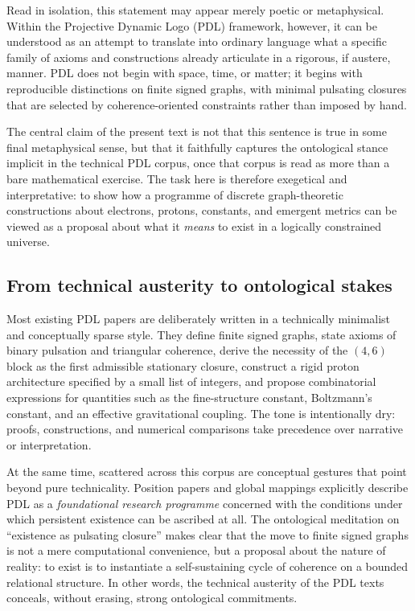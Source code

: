 \documentclass[11pt,a4paper]{article}
\theoremstyle{definition}
\begin{document}
Read in isolation, this statement may appear merely poetic or metaphysical. Within the Projective Dynamic Logo (PDL) framework, however, it can be understood as an attempt to translate into ordinary language what a specific family of axioms and constructions already articulate in a rigorous, if austere, manner.\cite{Laubscher_IntroPDL_2024,Laubscher_EmergencePhysicalReality_2024,Laubscher_PDL_Position_2024} PDL does not begin with space, time, or matter; it begins with reproducible distinctions on finite signed graphs, with minimal pulsating closures that are selected by coherence-oriented constraints rather than imposed by hand.

The central claim of the present text is not that this sentence is true in some final metaphysical sense, but that it faithfully captures the ontological stance implicit in the technical PDL corpus, once that corpus is read as more than a bare mathematical exercise. The task here is therefore exegetical and interpretative: to show how a programme of discrete graph-theoretic constructions about electrons, protons, constants, and emergent metrics can be viewed as a proposal about what it \emph{means} to exist in a logically constrained universe.\cite{Laubscher_Existence_PulsatingClosure_2026,Laubscher_PDL_GlobalMapping_v6_2024}

\subsection{From technical austerity to ontological stakes}

Most existing PDL papers are deliberately written in a technically minimalist and conceptually sparse style.\cite{Laubscher_EmergencePhysicalReality_2024,Laubscher_MinimalClosures_46_2024,Laubscher_ProtonArch_v2_2024,Laubscher_Alpha_v2_2024,Laubscher_EffectiveFields_2024,Laubscher_CavityModes_PDL_2024} They define finite signed graphs, state axioms of binary pulsation and triangular coherence, derive the necessity of the $(4,6)$ block as the first admissible stationary closure, construct a rigid proton architecture specified by a small list of integers, and propose combinatorial expressions for quantities such as the fine-structure constant, Boltzmann's constant, and an effective gravitational coupling. The tone is intentionally dry: proofs, constructions, and numerical comparisons take precedence over narrative or interpretation.

At the same time, scattered across this corpus are conceptual gestures that point beyond pure technicality. Position papers and global mappings explicitly describe PDL as a \emph{foundational research programme} concerned with the conditions under which persistent existence can be ascribed at all.\cite{Laubscher_PDL_Position_2024,Laubscher_PDL_GlobalMapping_v6_2024} The ontological meditation on ``existence as pulsating closure'' makes clear that the move to finite signed graphs is not a mere computational convenience, but a proposal about the nature of reality: to exist is to instantiate a self-sustaining cycle of coherence on a bounded relational structure.\cite{Laubscher_Existence_PulsatingClosure_2026} In other words, the technical austerity of the PDL texts conceals, without erasing, strong ontological commitments.
\end{document}
